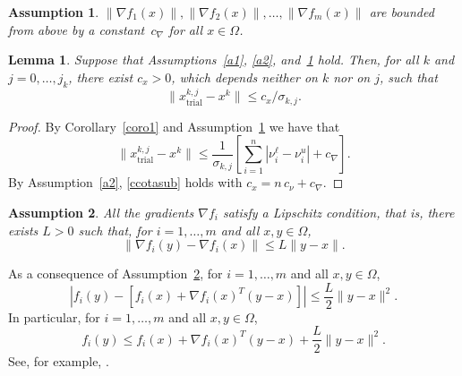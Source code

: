 \documentclass[11pt]{article}
\newcommand{\xkjtrial}{x^{k,j}_{\mathrm{trial}}}
\newtheorem{lemma}{Lemma}[section]
\newtheorem{assumption}{Assumption}
\begin{document}
\begin{assumption} \label{a3}
$\| \nabla f_1(x) \|, \| \nabla f_2(x) \|, \dots, \| \nabla f_m(x) \|$ are bounded from above by a constant~$c_{\nabla}$ for all $x \in \Omega$.
\end{assumption}

\begin{lemma} \label{lem2}
Suppose that Assumptions~\ref{a1}, \ref{a2}, and~\ref{a3} hold. Then, for all $k$ and $j=0,\dots,j_k$, there exist $c_x>0$, which depends neither on $k$ nor on $j$, such that
\begin{equation} \label{ccotasub}
 \| \xkjtrial - x^k \| \leq c_x / \sigma_{k,j}.
\end{equation}  
\end{lemma}

\begin{proof}
By Corollary~\ref{coro1} and Assumption~\ref{a3} we have that
\[
\| \xkjtrial - x^k \| \leq \dfrac{1}{\sigma_{k,j}} \left[ \sum_{i=1}^n \left| \nu^\ell_i - \nu^u_i \right| + c_{\nabla} \right].
\]
By Assumption~\ref{a2}, \eqref{ccotasub} holds with $c_x = n \, c_{\nu} + c_{\nabla}$.
\end{proof}

\begin{assumption} \label{a4}
All the gradients $\nabla f_i$ satisfy a Lipschitz condition, that is, there exists $L > 0$ such that, for $i=1,\dots,m$ and all $x,y \in \Omega$,
\begin{equation} \label{lipschitz}
\|\nabla f_i(y) - \nabla f_i(x)\| \leq L \|y - x\|.
\end{equation}
\end{assumption}

As a consequence of Assumption~\ref{a4}, for $i=1,\dots,m$ and all $x, y \in \Omega$,
\begin{equation} \label{taylor}
\left| f_i(y)- \left[ f_i(x) + \nabla f_i(x)^T (y - x) \right] \right| \leq \dfrac{L}{2}\|y - x\|^2.
\end{equation}        
In particular, for $i=1,\dots,m$ and all $x, y \in \Omega$,
\begin{equation} \label{taylor2}
f_i(y) \leq f_i(x) + \nabla f_i(x)^T (y - x) + \dfrac{L}{2}\|y - x\|^2.
\end{equation}
See, for example, \cite{bgmst1}.
\end{document}

